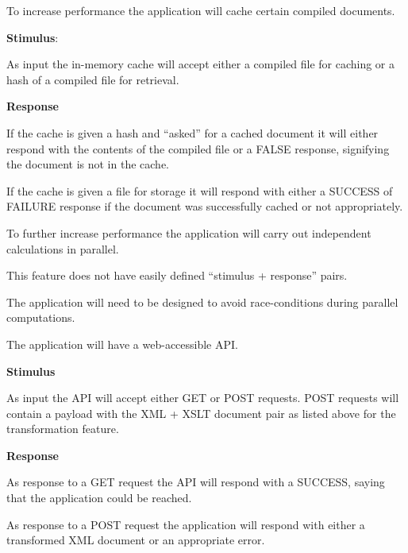 
To increase performance the application will cache certain compiled documents.
\begin{description}
  \item{
    \textbf{Stimulus}:

    As input the in-memory cache will accept either a compiled file for caching or a hash of a compiled file for retrieval.
  }
  \item{
    \textbf{Response}

    If the cache is given a hash and ``asked'' for a cached document it will either respond with the contents of the compiled file or a FALSE response, signifying the document is not in the cache.

    If the cache is given a file for storage it will respond with either a SUCCESS of FAILURE response if the document was successfully cached or not appropriately.
  }
\end{description}


To further increase performance the application will carry out independent calculations in parallel.

This feature does not have easily defined ``stimulus + response'' pairs.

The application will need to be designed to avoid race-conditions during parallel computations.


The application will have a web-accessible API.

\begin{description}
  \item{
    \textbf{Stimulus}

    As input the API will accept either GET or POST requests.
    POST requests will contain a payload with the XML + XSLT document pair as listed above for the transformation feature.
  }
  \item{
    \textbf{Response}

    As response to a GET request the API will respond with a SUCCESS, saying that the application could be reached.

    As response to a POST request the application will respond with either a transformed XML document or an appropriate error.
  }
\end{description}


